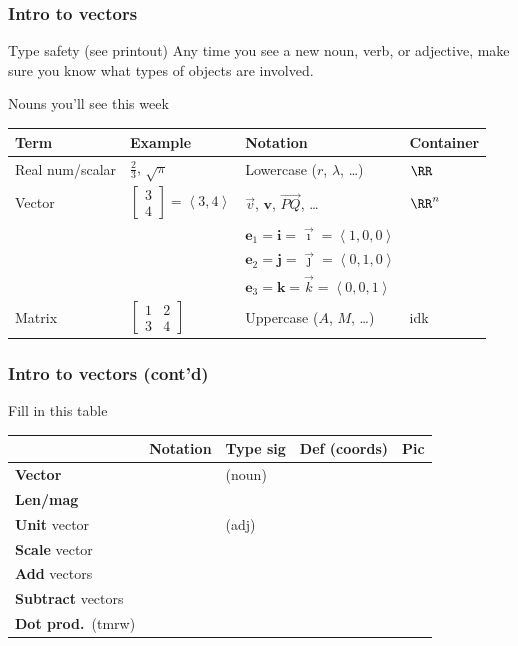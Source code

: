 \documentclass[11pt]{beamer}
\begin{document}
\begin{frame}
  \frametitle{Intro to vectors}
  \begin{alertblock}{Type safety (see printout)}
  Any time you see a new noun, verb, or adjective,
  make sure you know what \alert{types} of objects are involved.
  \end{alertblock}
  \begin{exampleblock}{Nouns you'll see this week}
    \begin{tabular}{llll}
      Term & Example & Notation & Container \\\hline
      Real num/scalar & $\frac23$, $\sqrt\pi$ & Lowercase ($r$, $\lambda$, \dots) & $\RR$ \\
      Vector & $\begin{bmatrix} 3 \\ 4 \end{bmatrix} = \left< 3,4 \right>$
             & $\vec v$, $\mathbf{v}$, $\overrightarrow{PQ}$, \dots & $\RR^n$ \\
             && $\mathbf{e}_1 = \mathbf{i} = \vec{\imath} = \left< 1,0,0 \right>$ \\
             && $\mathbf{e}_2 = \mathbf{j} = \vec{\jmath} = \left< 0,1,0 \right>$ \\
             && $\mathbf{e}_3 = \mathbf{k} = \vec{k} = \left< 0,0,1 \right>$ \\
      Matrix & $\begin{bmatrix} 1 & 2 \\ 3 & 4 \end{bmatrix}$ & Uppercase ($A$, $M$, \dots)
             & idk
    \end{tabular}
  \end{exampleblock}
\end{frame}

\begin{frame}
  \frametitle{Intro to vectors (cont'd)}
  \begin{block}{Fill in this table}
  \begin{tabular}{lllll}
    & Notation & Type sig & Def (coords) & Pic \\ \hline
    \textbf{Vector} & & (noun) \\
    \textbf{Len/mag} & \\
    \textbf{Unit} vector & & (adj) \\
    \textbf{Scale} vector & \\
    \textbf{Add} vectors & \\
    \textbf{Subtract} vectors & \\
    \textbf{Dot prod.}\ (tmrw) & \\
  \end{tabular}
  \end{block}
\end{frame}
\end{document}
